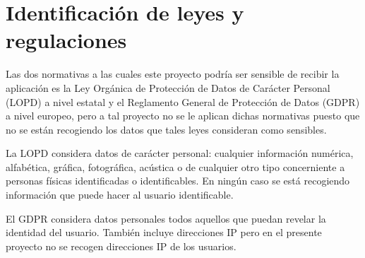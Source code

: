\chapter{Identificación de leyes y regulaciones}

Las dos normativas a las cuales este proyecto podría ser sensible de recibir la aplicación es la Ley Orgánica de Protección de Datos de Carácter Personal (LOPD) a nivel estatal y el Reglamento General de Protección de Datos (GDPR) a nivel europeo, pero a tal proyecto no se le aplican dichas normativas puesto que no se están recogiendo los datos que tales leyes consideran como sensibles.

La LOPD considera datos de carácter personal: cualquier información numérica, alfabética, gráfica, fotográfica, acústica o de cualquier otro tipo concerniente a personas físicas identificadas o identificables.
En ningún caso se está recogiendo información que puede hacer al usuario identificable.

El GDPR considera datos personales todos aquellos que puedan revelar la identidad del usuario. También incluye direcciones IP pero en el presente proyecto no se recogen direcciones IP de los usuarios.